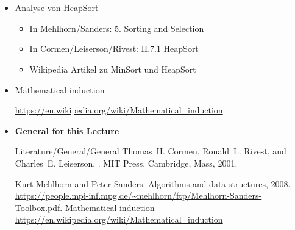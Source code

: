\documentclass{beamer}
\def\LectureLanguage{eng}
\newcommand\eatdot[1]{}
\begin{document}
\section*{\appendixname}
\subsection*{\LectureFurtherLiterature}
%
\begin{frame}{\LectureFurtherLiterature}
  \small
  \begin{itemize}
    \item Analyse von HeapSort
      \begin{itemize}
      \item In Mehlhorn/Sanders: 5. Sorting and Selection
      \item In Cormen/Leiserson/Rivest: II.7.1 HeapSort
      \item Wikipedia Artikel zu MinSort und HeapSort
      \end{itemize}
    \item      Mathematical induction
      \begin{center}
        \url{https://en.wikipedia.org/wiki/Mathematical_induction}\eatdot.
      \end{center}
  \end{itemize}
\end{frame}

\begin{frame}{\LectureFurtherLiterature}
  \small
  \begin{itemize}
  \item       \textbf{General for this Lecture}
      \begin{btSect}{Literature/General/General}
         Thomas~H. Cormen, Ronald~L. Rivest, and Charles~E. Leiserson.
         .
         \newblock MIT Press, Cambridge, Mass, 2001.
         
         Kurt Mehlhorn and Peter Sanders.
         \newblock Algorithms and data structures, 2008.
         \newblock
         \url{https://people.mpi-inf.mpg.de/~mehlhorn/ftp/Mehlhorn-Sanders-Toolbox.pdf}.
         Mathematical induction\eatdot.
         \newblock \url{https://en.wikipedia.org/wiki/Mathematical_induction}\eatdot.

      \end{btSect}
  \end{itemize}
\end{frame}
\end{document}
